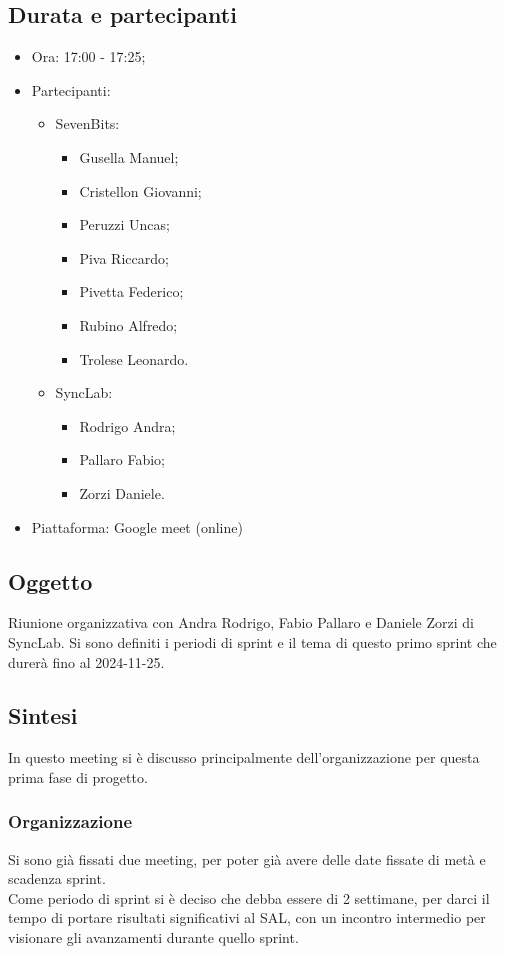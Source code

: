 \documentclass[12pt]{article}
\begin{document}
\subsection{Durata e partecipanti}
\begin{itemize}
\item Ora: 17:00 - 17:25;
\item Partecipanti: 	
	\begin{itemize}
        \item SevenBits:
        \begin{itemize}
			\item Gusella Manuel;
			\item Cristellon Giovanni;
			\item Peruzzi Uncas;
			\item Piva Riccardo;
			\item Pivetta Federico;
			\item Rubino Alfredo;
			\item Trolese Leonardo.
		\end{itemize}
		\item SyncLab:
		\begin{itemize}
			\item Rodrigo Andra;
			\item Pallaro Fabio;
			\item Zorzi Daniele.
		\end{itemize}
	\end{itemize}
\item Piattaforma: Google meet (online)
\end{itemize}
\subsection{Oggetto}
Riunione organizzativa con Andra Rodrigo, Fabio Pallaro e Daniele Zorzi di SyncLab.
Si sono definiti i periodi di sprint e il tema di questo primo sprint che durerà fino al 2024-11-25.

\subsection{Sintesi}
In questo meeting si è discusso principalmente dell'organizzazione per questa prima fase di progetto.
\subsubsection{Organizzazione}
Si sono già fissati due meeting, per poter già avere delle date fissate di metà e scadenza sprint.\\
Come periodo di sprint si è deciso che debba essere di 2 settimane, per darci il tempo di portare risultati significativi al SAL, con un incontro intermedio   per visionare gli avanzamenti durante quello sprint.
\end{document}
